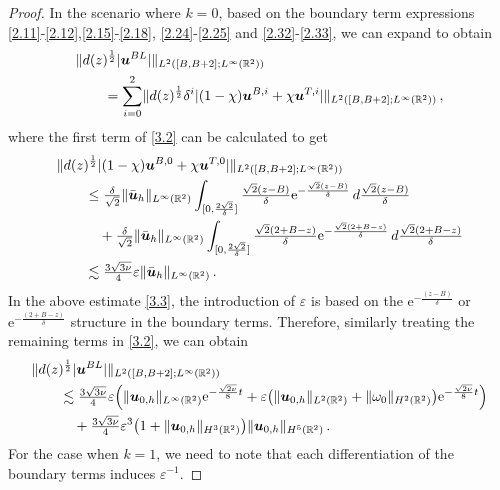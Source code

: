 \documentclass[pdflatex,sn-mathphys-num]{sn-jnl}%
\theoremstyle{thmstyleone}%
\theoremstyle{thmstyletwo}%
\theoremstyle{thmstylethree}%
\theoremstyle{thmstyletwo}
\begin{document}
\begin{proof}
	In the scenario where $k=0$, based on the boundary term expressions \eqref{2.11}-\eqref{2.12},\eqref{2.15}-\eqref{2.18}, \eqref{2.24}-\eqref{2.25} and \eqref{2.32}-\eqref{2.33}, 
	we can expand to obtain
	\begin{align}\label{3.2}
		&\lVert d(z)^{\frac{1}{2}} |\boldsymbol{u}^{BL}| \rVert_{{L}^2([B,B+2];{L}^\infty(\mathbb{R}^2))}\notag\\
		&\qquad=\sum\limits_{i=0}^2\lVert d(z)^{\frac{1}{2}} \delta^i|(1-\chi)\boldsymbol{u}^{B,i}+\chi\boldsymbol{u}^{T,i}| \rVert_{{L}^2([B,B+2];{L}^\infty(\mathbb{R}^2))}\,,
	\end{align}
	where the first term of \eqref{3.2} can be calculated to get
	\begin{align}
		&\lVert d(z)^{\frac{1}{2}} |(1-\chi)\boldsymbol{u}^{B,0}+\chi\boldsymbol{u}^{T,0}| \rVert_{{L}^2([B,B+2];{L}^\infty(\mathbb{R}^2))}\notag\\
		&\qquad\leq
		\tfrac{\delta}{\sqrt{2}}\lVert\bar{\boldsymbol{u}}_h\rVert_{{L}^\infty(\mathbb{R}^2)}
		\int_{[0,\frac{2\sqrt{2}}{\delta}]}
		\tfrac{\sqrt{2}(z-B)}{\delta}
		\mathrm{e}^{-\frac{\sqrt{2}(z-B)}{\delta}}
		\,{d}\tfrac{\sqrt{2}(z-B)}{\delta}\notag\\
		&\qquad\quad+\tfrac{\delta}{\sqrt{2}}\lVert\bar{\boldsymbol{u}}_h\rVert_{{L}^\infty(\mathbb{R}^2)}
		\int_{[0,\frac{2\sqrt{2}}{\delta}]}
		\tfrac{\sqrt{2}(2+B-z)}{\delta}
		\mathrm{e}^{-\frac{\sqrt{2}(2+B-z)}{\delta}}\,{d}\tfrac{\sqrt{2}(2+B-z)}{\delta}\notag\\
		&\qquad\lesssim\tfrac{3\sqrt{3\nu}}{4}\varepsilon\lVert\bar{\boldsymbol{u}}_h\rVert_{{L}^\infty(\mathbb{R}^2)}\,.\label{3.3}
	\end{align}	
	In the above estimate \eqref{3.3}, the introduction of $\varepsilon$ is based on the $\mathrm{e}^{-\frac{(z-B)}{\delta}}$ or $\mathrm{e}^{-\frac{(2+B-z)}{\delta}}$ structure in the boundary terms. Therefore, similarly treating the remaining terms in \eqref{3.2}, we can obtain
	\begin{align*}
		&\lVert d(z)^{\frac{1}{2}} |\boldsymbol{u}^{BL}| \rVert_{{L}^2([B,B+2];{L}^\infty(\mathbb{R}^2))}\notag\\
		&\qquad\lesssim\tfrac{3\sqrt{3\nu}}{4}\varepsilon\Big(
		\lVert{\boldsymbol{u}}_{0,h}\rVert_{{L}^\infty(\mathbb{R}^2)} \mathrm{e}^{-\frac{\sqrt{2\nu}}{8}  t}
		+\varepsilon\big(
		\lVert{\boldsymbol{u}}_{0,h}\rVert_{L^2(\mathbb{R}^2)}+\lVert{\omega}_0\rVert_{H^2(\mathbb{R}^2)}
		\big)\mathrm{e}^{-\frac{\sqrt{2\nu}}{8}  t}\Big)
		\notag\\
		&\qquad\quad+\tfrac{3\sqrt{3\nu}}{4}\varepsilon^3
		\big(
		1+
		\lVert {\boldsymbol{u}}_{0,h} \rVert_{H^{3}(\mathbb{R}^2)}
		\big)
		\lVert {\boldsymbol{u}}_{0,h} \rVert_{H^{5}(\mathbb{R}^2)}
		\,.
	\end{align*}
	For the case when $k=1$, we need to note that each differentiation of the boundary terms induces $\varepsilon^{-1}$.
	

\end{proof}
\end{document}
